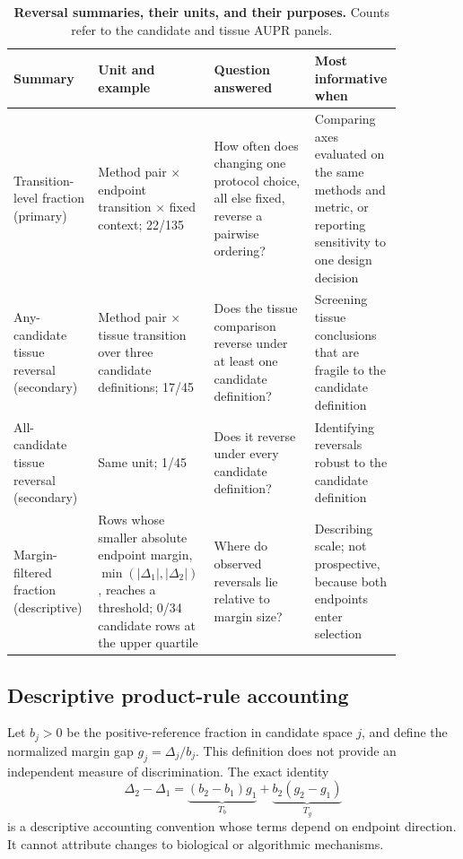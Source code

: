 \documentclass[10pt,letterpaper]{article}
\begin{document}
\begin{table}[!ht]
\centering
\caption{{\bf Reversal summaries, their units, and their purposes.} Counts refer to the candidate and tissue AUPR panels.}
\small
\begin{tabular}{>{\raggedright\arraybackslash}p{0.21\linewidth}>{\raggedright\arraybackslash}p{0.20\linewidth}>{\raggedright\arraybackslash}p{0.25\linewidth}>{\raggedright\arraybackslash}p{0.20\linewidth}}
\toprule
\textbf{Summary} & \textbf{Unit and example} & \textbf{Question answered} & \textbf{Most informative when}\\
\midrule
Transition-level fraction (primary) & Method pair $\times$ endpoint transition $\times$ fixed context; 22/135 & How often does changing one protocol choice, all else fixed, reverse a pairwise ordering? & Comparing axes evaluated on the same methods and metric, or reporting sensitivity to one design decision\\
Any-candidate tissue reversal (secondary) & Method pair $\times$ tissue transition over three candidate definitions; 17/45 & Does the tissue comparison reverse under at least one candidate definition? & Screening tissue conclusions that are fragile to the candidate definition\\
All-candidate tissue reversal (secondary) & Same unit; 1/45 & Does it reverse under every candidate definition? & Identifying reversals robust to the candidate definition\\
Margin-filtered fraction (descriptive) & Rows whose smaller absolute endpoint margin, $\min(|\Delta_1|,|\Delta_2|)$, reaches a threshold; 0/34 candidate rows at the upper quartile & Where do observed reversals lie relative to margin size? & Describing scale; not prospective, because both endpoints enter selection\\
\bottomrule
\end{tabular}
\label{tab:estimands}
\end{table}

\subsection*{Descriptive product-rule accounting}
Let $b_j>0$ be the positive-reference fraction in candidate space $j$, and define the normalized margin gap $g_j=\Delta_j/b_j$. This definition does not provide an independent measure of discrimination. The exact identity
\begin{equation}
\Delta_2-\Delta_1=\underbrace{(b_2-b_1)g_1}_{T_b}+\underbrace{b_2(g_2-g_1)}_{T_g}
\label{eq:accounting}
\end{equation}
is a descriptive accounting convention whose terms depend on endpoint direction. It cannot attribute changes to biological or algorithmic mechanisms.
\end{document}

